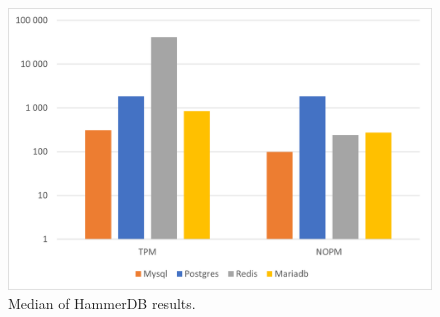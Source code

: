 \begin{figure}[h]
\centering
    \includegraphics[width=0.8\columnwidth]{results/median/10m/hammerdb.png}
\caption{Median of HammerDB results.}
\label{fig:medianhammerdb10m}
\end{figure}

